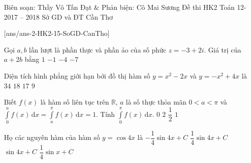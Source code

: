 \begin{name}
{Biên soạn: Thầy Võ Tấn Đạt \& Phản biện: Cô Mai Sương }
{Đề thi HK2 Toán 12-2017 – 2018 Sở GD và ĐT Cần Thơ}
\end{name}
\setcounter{ex}{0}\setcounter{bt}{0}
[ans/ans-2-HK2-15-SoGD-CanTho]

\begin{ex}%
	Gọi $a, b$ lần lượt là phần thực và phần ảo của số phức $z=-3+2i$. Giá trị của $a+2b$ bằng
	\choice
	{\True $1$}
	{$-1$}
	{$-4$}
	{$-7$}
\end{ex}

\begin{ex}%
	Diện tích hình phẳng giới hạn bởi đồ thị hàm số $y=x^2-2x$ và $y=-x^2+4x$ là
	\choice
	{$34$}
	{$18$}
	{$17$}
	{\True $9$}
\end{ex}

\begin{ex}%
	Biết $f(x)$ là hàm số liên tục trên $\mathbb{R}$, $a$ là số thực thỏa mãn $0< a<\pi$ và 
	$\displaystyle\int\limits_0^a f(x) \mathrm{\,d}x=\displaystyle\int\limits_a^{\pi} f(x) \mathrm{\,d}x=1$. Tính $\displaystyle\int\limits_0^{\pi} f(x) \mathrm{\,d}x$.
	\choice
	{$0$}
	{\True $2$}
	{$\dfrac{1}{2}$}
	{$1$}
\end{ex}

\begin{ex}%
	Họ các nguyên hàm của hàm số $y=\cos 4x$ là
	\choice
	{$-\dfrac{1}{4}\sin 4x+C$}
	{\True $\dfrac{1}{4}\sin 4x+C$}
	{$\sin 4x+C$}
	{$\dfrac{1}{4}\sin x+C$}
\end{ex}

